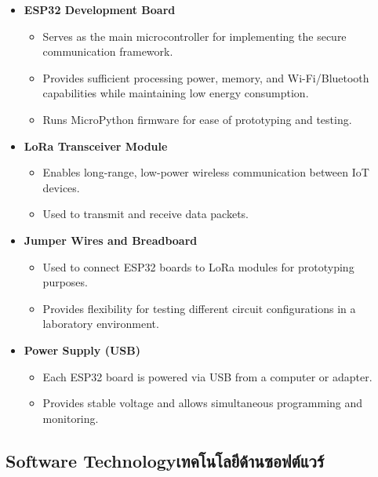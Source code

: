 \begin{itemize}
    \item \textbf{ESP32 Development Board} 
    \begin{itemize}
            \item Serves as the main microcontroller for implementing the secure communication framework. \item Provides sufficient processing power, memory, and Wi-Fi/Bluetooth capabilities while maintaining low energy consumption.
            \item Runs MicroPython firmware for ease of prototyping and testing.

        \end{itemize} 
    \item \textbf{LoRa Transceiver Module} 
        \begin{itemize} 
            \item Enables long-range, low-power wireless communication between IoT devices.
            \item Used to transmit and receive data packets.
        \end{itemize} 

    \item \textbf{Jumper Wires and Breadboard} 
        \begin{itemize} 
            \item  Used to connect ESP32 boards to LoRa modules for prototyping purposes.
            \item    Provides flexibility for testing different circuit configurations in a laboratory environment.
        \end{itemize} 
 

    \item \textbf{Power Supply (USB)} 
      \begin{itemize} 
            \item Each ESP32 board is powered via USB from a computer or adapter.
            \item Provides stable voltage and allows simultaneous programming and monitoring.
        \end{itemize} 
\end{itemize}


\subsection{\ifenglish Software Technology\else เทคโนโลยีด้านซอฟต์แวร์\fi}

